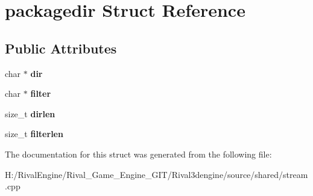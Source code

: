 \hypertarget{structpackagedir}{}\section{packagedir Struct Reference}
\label{structpackagedir}
\subsection*{Public Attributes}
\begin{DoxyCompactItemize}
\item 
\mbox{\label{structpackagedir_aa88909fd8e992cfe2d22bf462579259e}} 
char $\ast$ {\bfseries dir}
\item 
\mbox{\label{structpackagedir_a7c712e7fda74c835c13a4c354854e8a9}} 
char $\ast$ {\bfseries filter}
\item 
\mbox{\label{structpackagedir_ae7da5dce4d6e49c28c3b5599d5322786}} 
size\+\_\+t {\bfseries dirlen}
\item 
\mbox{\label{structpackagedir_a339fa3201b55c415a9f5b8b9cb0790b4}} 
size\+\_\+t {\bfseries filterlen}
\end{DoxyCompactItemize}


The documentation for this struct was generated from the following file\+:\begin{DoxyCompactItemize}
\item 
H\+:/\+Rival\+Engine/\+Rival\+\_\+\+Game\+\_\+\+Engine\+\_\+\+G\+I\+T/\+Rival3dengine/source/shared/stream.\+cpp\end{DoxyCompactItemize}
